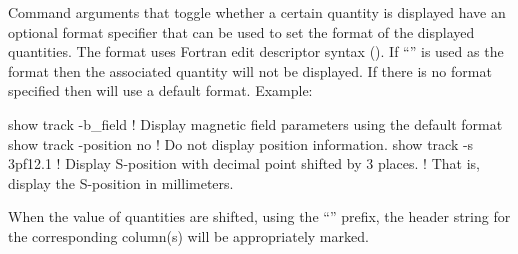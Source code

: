 {{{{{{{{{{Command arguments that toggle whether a certain quantity is displayed have an optional 
format specifier that can be used to set the format of the displayed quantities. The format uses
Fortran edit descriptor syntax (). If ``'' is used as the format then
the associated quantity will not be displayed. If there is no format specified then \tao will use
a default format. Example:
\begin{example}
  show track -b_field      ! Display magnetic field parameters using the default format
  show track -position no  ! Do not display position information.
  show track -s 3pf12.1    ! Display S-position with decimal point shifted by 3 places.
                           !   That is, display the S-position in millimeters.
\end{example}
When the value of quantities are shifted, using the ``'' prefix, the header string for the
corresponding column(s) will be appropriately marked.

}}}}}}}}}}
